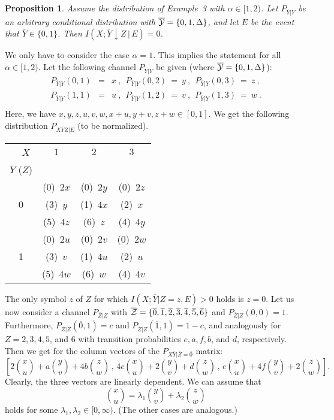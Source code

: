 \documentclass{article}
\newtheorem{prop}[theo]{Proposition}
\newcommand{\CE}{{E}}
\newcommand{\al}{\alpha}
\newcommand{\OY}{\overline{Y}}
\newcommand{\OZ}{\overline{Z}}
\newcommand{\CY}{{\cal Y}}
\newcommand{\CZ}{{\cal Z}}
\newcommand{\gd}{\Delta}
\begin{document}
\begin{prop}\label{prop1}
Assume  the  distribution of Example~3 with
 $\al\in[1,2)$.
Let $P_{\OY|Y}$ be an arbitrary conditional distribution with
$\overline{\CY}=\{0,1,\gd\}$, and let 
$\CE$ be the event that $\OY\in\{0,1\}$.
Then $I(X;\OY\downarrow Z\, |\, \CE)=0$.
\end{prop}

\proof
We only have to consider the case $\alpha=1$. This implies the statement for 
all $\al\in[1,2)$. Let the following channel $P_{\OY|Y}$ be given (where
$\overline{\CY}=\{0,1,\gd\}$):
\begin{eqnarray*}
P_{\OY|Y}(0,1)&=&x\ ,\ \ P_{\OY|Y}(0,2)\ =\ y\ ,\ \ P_{\OY|Y}(0,3)\ =\ z\ ,\\
P_{\OY|Y}(1,1)&=&u\ ,\ \ P_{\OY|Y}(1,2)\ =\ v\ ,\ \ P_{\OY|Y}(1,3)\ =\ w\ .\\
\end{eqnarray*}
Here, we have $x,y,z,u,v,w,x+u,y+v,z+w\in[0,1]$. We get the 
following distribution $P_{X\OY Z|\CE}$ (to be normalized).
\\
\begin{center}
\begin{tabular}{|c||c|c|c|}
\hline
\ \ $X$ & $1$ & $2$ & $3$\\
$\OY$ ($Z$) &&&\\
\hline\hline
 & (0)\ $2x$ & (0)\ $2y$ & (0)\ $2z$\\
0 & (3)\ $y$ & (1)\ $4x$ & (2)\ $x$\\
  & (5)\ $4z$ & (6)\ $z$ & (4)\ $4y$\\
\hline
& (0)\ $2u$ & (0)\ $2v$ & (0)\ $2w$\\
1 & (3)\ $v$ & (1)\ $4u$ & (2)\ $u$\\
  & (5)\ $4w$ & (6)\ $w$ & (4)\ $4v$\\
\hline
\end{tabular}
\end{center}




The only symbol $z$ of $Z$ for which $I(X;\OY|Z=z,\CE)>0$ holds is $z=0$.
Let us now consider a channel $P_{\OZ|Z}$ with $\overline{\CZ}=\{\overline{0}, 
\overline{1}, \overline{2}, \overline{3}, \overline{4}, \overline{5}, 
\overline{6}\}$ and $P_{\OZ|Z}(0,0)=1$. Furthermore,
 $P_{\OZ|Z}(\overline{0},1)=c$ and $P_{\OZ|Z}(\overline{1},1)=1-c$,
and analogously for $Z=2,3,4,5$, and $6$
with transition
probabilities $e,a,f,b$, and $d$, respectively. Then we get for the 
column vectors of the $P_{X\OY|\OZ=\overline{0}}$ matrix:
\[
\left[
2{x \choose u}+a{y \choose v}+4b{z \choose w}\, ,\,
 4c{x \choose u}+2{y \choose 
v}+d{z \choose w}\, ,\, e{x \choose u}+4f{y \choose v}+2{z \choose w}
\right].
\]
Clearly, the three vectors are linearly dependent. We can assume  that 
\[
{x \choose u}=\lambda_1{y \choose v}+\lambda_2{z \choose w}
\]
holds for some $\lambda_1,\lambda_2\in[0,\infty)$.
(The other cases are analogous.) 
\end{document}
